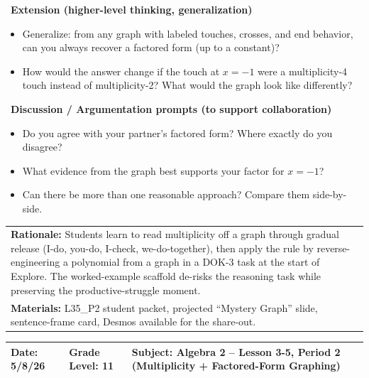 \documentclass[11pt]{article}
\begin{document}
\vspace{1em}

\noindent \textbullet \ \textbf{Extension (higher-level thinking, generalization)}
\begin{itemize}[label=$\bullet$, leftmargin=0.5in]
    \item Generalize: from any graph with labeled touches, crosses, and end behavior, can you always recover a factored form (up to a constant)?
    \item How would the answer change if the touch at $x=-1$ were a multiplicity-4 touch instead of multiplicity-2? What would the graph look like differently?
\end{itemize}

\vspace{1em}

\noindent \textbullet \ \textbf{Discussion / Argumentation prompts (to support collaboration)}
\begin{itemize}[label=$\bullet$, leftmargin=0.5in]
    \item Do you agree with your partner's factored form? Where exactly do you disagree?
    \item What evidence from the graph best supports your factor for $x=-1$?
    \item Can there be more than one reasonable approach? Compare them side-by-side.
\end{itemize}

\newpage


\noindent
\begin{tabularx}{\textwidth}{|X|}
\hline
\textbf{Rationale:} Students learn to read multiplicity off a graph through gradual release (I-do, you-do, I-check, we-do-together), then apply the rule by reverse-engineering a polynomial from a graph in a DOK-3 task at the start of Explore. The worked-example scaffold de-risks the reasoning task while preserving the productive-struggle moment. \\
\textbf{Materials:} L35\_P2 student packet, projected ``Mystery Graph'' slide, sentence-frame card, Desmos available for the share-out. \\
\hline
\end{tabularx}

\vspace{-1.2pt}
\noindent
\begin{tabularx}{\textwidth}{|>{\hsize=0.8\hsize}X|>{\hsize=0.8\hsize}X|>{\hsize=1.4\hsize}X|}
\hline
\textbf{Date:} 5/8/26 & \textbf{Grade Level:} 11 & \textbf{Subject:} Algebra 2 -- Lesson 3-5, Period 2 (Multiplicity + Factored-Form Graphing) \\
\hline
\end{tabularx}
\end{document}
